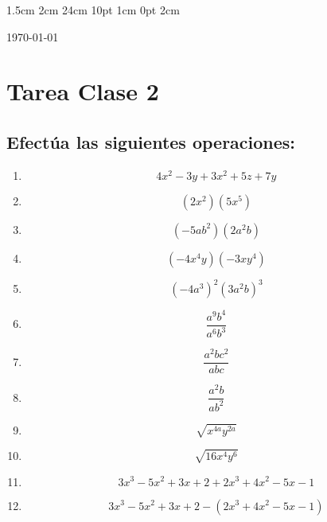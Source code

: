 \documentclass[12pt,letterpaper]{report}
\begin{document}
\setmargins{2.5cm}      
{1.5cm}                     
{2cm}  
{24cm}                    
{10pt}                          
{1cm}                          
{0pt}                             
{2cm}
\begin{flushright}
\today
\end{flushright}
\vspace{-1.75cm}
\section*{Tarea Clase 2}
\subsection*{Efectúa las siguientes operaciones:}
\begin{enumerate}
    \item \begin{equation*}
        4x^2-3y+3x^2+5z+7y
    \end{equation*}
    \item \begin{equation*}
    (2x^2)(5x^5)    
    \end{equation*}
    \item \begin{equation*}
        (-5ab^2)(2a^2b)
    \end{equation*}
    \item \begin{equation*}
        (-4x^4y)(-3xy^4)
    \end{equation*}
    \item \begin{equation*}
        (-4a^3)^2(3a^2b)^3
    \end{equation*}
    \item \begin{equation*}
        \frac{a^9b^4}{a^6b^3}
    \end{equation*}
\item \begin{equation*}
\frac{a^2bc^2 }{abc}
\end{equation*}
\item \begin{equation*}
    \frac{a^2b}{ab^2}
\end{equation*}
\item \begin{equation*}
    \sqrt{x^{4a}y^{2a}}
\end{equation*}
\item \begin{equation*}
    \sqrt{16x^4y^6}
\end{equation*}
\item \begin{equation*}
    3x^3-5x^2+3x+2+2x^3+4x^2-5x-1
\end{equation*}
\item \begin{equation*}
    3x^3-5x^2+3x+2-(2x^3+4x^2-5x-1)
\end{equation*}
\end{enumerate}
\end{document}
